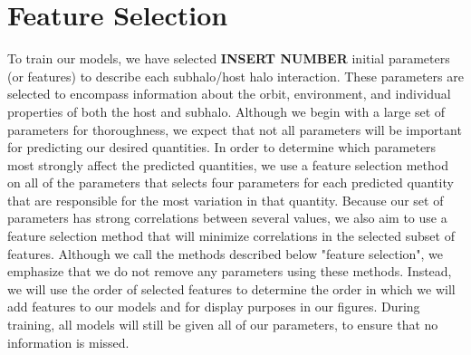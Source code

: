 \documentclass[fleqn,usenatbib]{mnras}
\begin{document}
\section{Feature Selection}
\label{sec:feature selection} %
To train our models, we have selected \textbf{INSERT NUMBER} initial parameters (or features) to describe each subhalo/host halo interaction. These parameters are selected to encompass information about the orbit, environment, and individual properties of both the host and subhalo. Although we begin with a large set of parameters for thoroughness, we expect that not all parameters will be important for predicting our desired quantities. In order to determine which parameters most strongly affect the predicted quantities, we use a feature selection method on all of the parameters that selects four parameters for each predicted quantity that are responsible for the most variation in that quantity. Because our set of parameters has strong correlations between several values, we also aim to use a feature selection method that will minimize correlations in the selected subset of features.
Although we call the methods described below "feature selection", we emphasize that we do not remove any parameters using these methods. Instead, we will use the order of selected features to determine the order in which we will add features to our models and for display purposes in our figures. During training, all models will still be given all of our parameters, to ensure that no information is missed.
\end{document}
